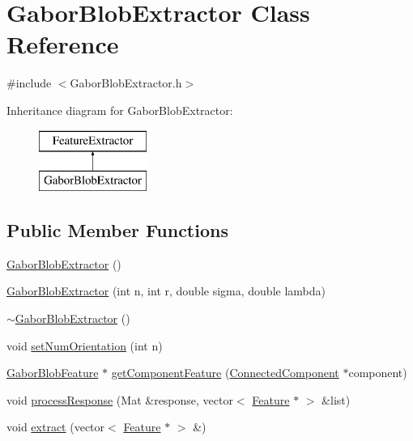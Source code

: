 \hypertarget{class_gabor_blob_extractor}{\section{Gabor\+Blob\+Extractor Class Reference}
\label{class_gabor_blob_extractor}
}


{\ttfamily \#include $<$Gabor\+Blob\+Extractor.\+h$>$}

Inheritance diagram for Gabor\+Blob\+Extractor\+:\begin{figure}[H]
\begin{center}
\leavevmode
\includegraphics[height=2.000000cm]{class_gabor_blob_extractor}
\end{center}
\end{figure}
\subsection*{Public Member Functions}
\begin{DoxyCompactItemize}
\item 
\hyperlink{class_gabor_blob_extractor_a7f3a5a4c61cd515fbae56fdfefe3d004}{Gabor\+Blob\+Extractor} ()
\item 
\hyperlink{class_gabor_blob_extractor_a5c911de75dbda420e572cf1715440bb1}{Gabor\+Blob\+Extractor} (int n, int r, double sigma, double lambda)
\item 
\hyperlink{class_gabor_blob_extractor_ac13442f2a5ca9d980efb4ed93c6576f6}{$\sim$\+Gabor\+Blob\+Extractor} ()
\item 
void \hyperlink{class_gabor_blob_extractor_a033c00368027417ff74d14ce98e12108}{set\+Num\+Orientation} (int n)
\item 
\hyperlink{class_gabor_blob_feature}{Gabor\+Blob\+Feature} $\ast$ \hyperlink{class_gabor_blob_extractor_a9f332a64eaa87a97cd48fbc34a5a58da}{get\+Component\+Feature} (\hyperlink{class_connected_component}{Connected\+Component} $\ast$component)
\item 
void \hyperlink{class_gabor_blob_extractor_a8111b21c0587c91e53267bdcef9b1882}{process\+Response} (Mat \&response, vector$<$ \hyperlink{class_feature}{Feature} $\ast$ $>$ \&list)
\item 
void \hyperlink{class_gabor_blob_extractor_aff19b47162d8d4244ac9325b82f1de4f}{extract} (vector$<$ \hyperlink{class_feature}{Feature} $\ast$ $>$ \&)
\end{DoxyCompactItemize}

